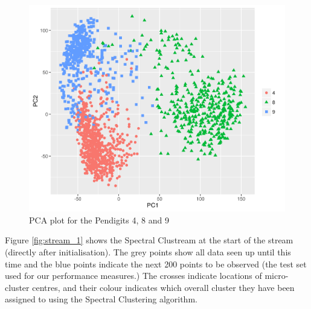 \begin{figure}[!h]
  \centering
 \includegraphics[width=.6\linewidth]{evolving_pen/evolving_pen_48_49_truth.png}  
\caption{PCA plot for the Pendigits 4, 8 and 9}
\label{fig:48_49_pca}
\end{figure}

Figure \ref{fig:stream_1} shows the Spectral Clustream at the start of the stream (directly after initialisation). The grey points show all data seen up until this time and the blue points indicate the next 200 points to be observed (the test set used for our performance measures.) The crosses indicate locations of micro-cluster centres, and their colour indicates which overall cluster they have been assigned to using the Spectral Clustering algorithm. 


